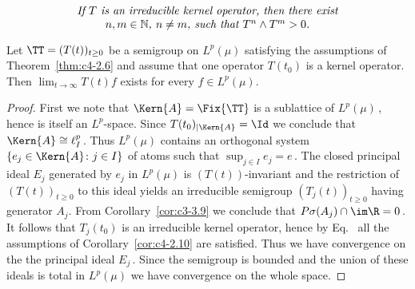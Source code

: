\begin{equation}\label{eq:429}
\parbox{0.8\textwidth}{\centering\itshape
If $T$ is an irreducible kernel operator, then there exist 
$n,m \in \mathbb{N}$, $n \neq m$, such that $T^n \wedge T^m > 0$.}
\end{equation}
\begin{corollary}\label{cor:c4-2.11}%
%
Let $\TT = (T(t))_{t\geq 0}$ be a semigroup on $L^{p}(\mu)$ satisfying the assumptions of Theorem~\ref{thm:c4-2.6} and assume that one operator $T(t_{0})$ is a kernel operator.
Then $\lim_{t \to \infty}T(t)f$ exists for every $f \in L^{p}(\mu)$.
\end{corollary}
\begin{proof}
First we note that $\Kern{A} = \Fix{\TT}$ is a sublattice of $L^p(\mu)$\,, hence is itself an $L^p$-space. 
Since $T(t_0)_{\vert \Kern{A}} = \Id$  we conclude that  $\Kern{A} \cong \ell^p_I$\,.  
Thus $L^p(\mu)$ contains an orthogonal system $\{e_j \in \Kern{A} \colon j \in I\}$  of atoms such that $\sup_{j \in I} e_j = e$\,.
The closed principal ideal $E_j$ generated by $e_j$ in  $L^p(\mu)$ is $(T(t))$-invariant and the restriction of $(T(t))_{t \geq 0}$  to this ideal yields an irreducible semigroup $(T_j(t))_{t \geq 0}$ having generator $A_j$. 
From Corollary~\ref{cor:c3-3.9}  we conclude that  $P\sigma(A_j) \cap \im\R = {0}$\,. 
It follows that $T_j(t_0)$ is an irreducible kernel operator, hence by Eq.~ all the assumptions of Corollary~\ref{cor:c4-2.10} are satisfied.
Thus we have convergence on the the principal ideal $E_j$\,. 
Since the semigroup is bounded and the union of these ideals is total in  $L^p(\mu)$  we have convergence on the whole space.
\end{proof}

